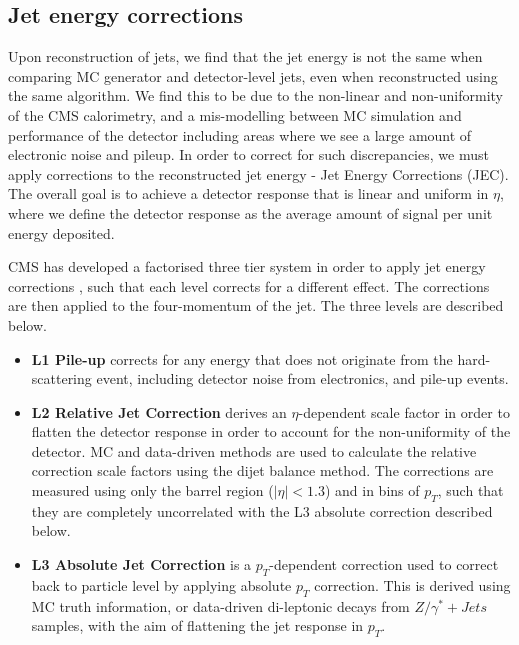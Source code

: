 
\subsection{Jet energy corrections} \label{subsec-JEC}

Upon reconstruction of jets, we find that the jet energy is not the same when comparing MC generator and detector-level jets, even when reconstructed using the same algorithm. We find this to be due to the non-linear and non-uniformity of the CMS calorimetry, and a mis-modelling between MC simulation and performance of the detector including areas where we see a large amount of electronic noise and pileup. In order to correct for such discrepancies, we must apply corrections to the reconstructed jet energy - Jet Energy Corrections (JEC). The overall goal is to achieve a detector response that is linear and uniform in $\eta$, where we define the detector response as the average amount of signal per unit energy deposited.

CMS has developed a factorised three tier system in order to apply jet energy corrections \cite{1742-6596-404-1-012014}, such that each level corrects for a different effect. The corrections are then applied to the four-momentum of the jet. The three levels are described below.

\begin{itemize}
	\item \textbf{L1 Pile-up} corrects for any energy that does not originate from the hard-scattering event, including detector noise from electronics, and pile-up events.
	\item \textbf{L2 Relative Jet Correction} derives an $\eta$-dependent scale factor in order to flatten the detector response in order to account for the non-uniformity of the detector. MC and data-driven methods are used to calculate the relative correction scale factors using the dijet balance method. The corrections are measured using only the barrel region ($|\eta| < 1.3$) and in bins of $p_T$, such that they are completely uncorrelated with the L3 absolute correction described below. 
	\item \textbf{L3 Absolute Jet Correction} is a $p_T$-dependent correction used to correct back to particle level by applying absolute $p_T$ correction. This is derived using MC truth information, or data-driven di-leptonic decays from $Z/\gamma^*+Jets$ samples, with the aim of flattening the jet response in $p_T$. 
\end{itemize} 

